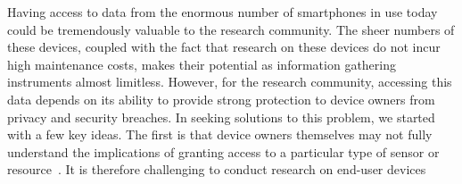 Having access to data from the enormous number of smartphones 
in use today could be tremendously valuable to the research 
community. The sheer numbers of these devices, coupled with the fact that research on these devices do not incur high maintenance costs, makes their potential as information gathering instruments almost limitless. 
However, for the research community, accessing this data depends on its 
ability to provide strong protection to device owners from privacy 
and security breaches. In seeking solutions to this problem, we started with a few key ideas. The first is that device owners themselves may not fully understand the implications of granting access to a particular type of sensor or resource~\cite{felt2012android}. It is 
therefore challenging to conduct research on end-user devices
